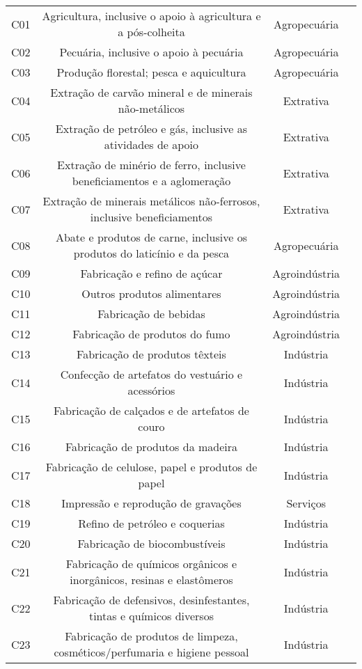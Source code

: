\begin{apendicesenv}
\begin{small}
\begin{center}
\begin{longtable}{lccc}
				C01 & Agricultura, inclusive o apoio à   agricultura e a pós-colheita & Agropecuária \\
				C02 & Pecuária, inclusive o apoio à pecuária & Agropecuária \\
				C03 & Produção florestal; pesca e aquicultura & Agropecuária \\
				C04 & Extração de carvão mineral e de minerais não-metálicos & Extrativa \\
				C05 & Extração de petróleo e gás, inclusive as atividades de apoio & Extrativa \\
				C06 & Extração de minério de ferro, inclusive beneficiamentos e a aglomeração & Extrativa \\
				C07 & Extração de minerais metálicos não-ferrosos, inclusive beneficiamentos & Extrativa \\
				C08 & Abate e produtos de carne, inclusive os produtos do laticínio e da pesca & Agropecuária \\
				C09 & Fabricação e refino de açúcar & Agroindústria \\
				C10 & Outros produtos alimentares & Agroindústria \\
				C11 & Fabricação de bebidas & Agroindústria \\
				C12 & Fabricação de produtos do fumo & Agroindústria \\
				C13 & Fabricação de produtos têxteis & Indústria \\
				C14 & Confecção de artefatos do vestuário e acessórios & Indústria \\
				C15 & Fabricação de calçados e de artefatos de couro & Indústria \\
				C16 & Fabricação de produtos da madeira & Indústria \\
				C17 & Fabricação de celulose, papel e produtos de papel & Indústria \\
				C18 & Impressão e reprodução de gravações & Serviços \\
				C19 & Refino de petróleo e coquerias & Indústria \\
				C20 & Fabricação de biocombustíveis & Indústria \\
				C21 & Fabricação de químicos orgânicos e inorgânicos, resinas e elastômeros & Indústria \\
				C22 & Fabricação de defensivos, desinfestantes, tintas e químicos diversos & Indústria \\
				C23 & Fabricação de produtos de limpeza, cosméticos/perfumaria e higiene   pessoal & Indústria \\

\end{longtable}
\end{center}
\end{small}
\end{apendicesenv}

